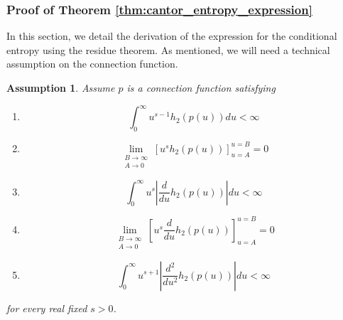 \documentclass{article}
\newtheorem{assumption}{Assumption}
\newcommand{\tti}{\rightarrow\infty}
\newcommand{\ttz}[0]{\rightarrow 0}
\begin{document}
\subsubsection{Proof of Theorem \ref{thm:cantor_entropy_expression}}
\label{sec:residue}
In this section, we detail the derivation of the expression for the conditional entropy using the residue theorem. As mentioned, we will need a technical assumption on the connection function.

\begin{assumption}
\label{eq:moment_bounded}
Assume $p$ is a connection function satisfying
    \begin{enumerate}
    \item \begin{equation}
        \int_0^{\infty} u^{s-1}h_2(p(u))du < \infty
    \end{equation}
    \item \begin{equation}
        \lim_{\substack{B\tti \\ A \ttz}}\left[u^sh_2(p(u))\right]_{u=A}^{u=B} = 0
    \end{equation}
    \item \begin{equation}
        \int_0^{\infty}u^{s}\left|\frac{d}{du}h_2(p(u))\right|du < \infty
    \end{equation}
    \item \begin{equation}
         \lim_{\substack{B\tti \\ A \ttz}}\left[u^s\frac{d}{du}h_2(p(u))\right]_{u=A}^{u=B} = 0
    \end{equation}
    \item \begin{equation}
        \int_0^{\infty} u^{s+1}\left|\frac{d^2}{du^2}h_2(p(u))\right|du < \infty
    \end{equation}
\end{enumerate}
for every real fixed $s > 0$.
\end{assumption}
\end{document}
